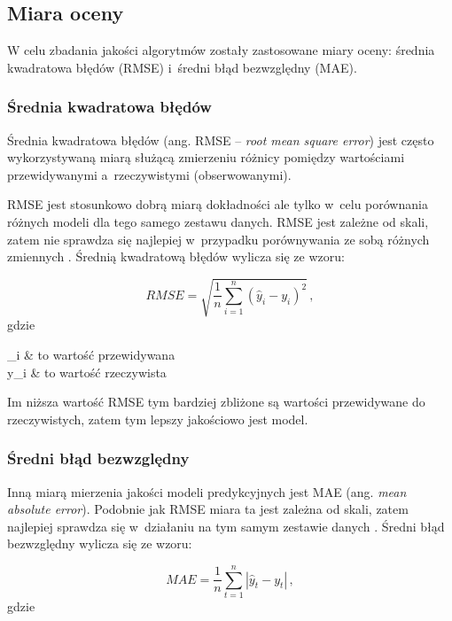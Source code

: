 \documentclass[twoside]{iisthesis}
\begin{document}
		\subsection{Miara oceny}
		
		W celu zbadania jakości algorytmów zostały zastosowane miary oceny: średnia kwadratowa błędów (RMSE) i~średni błąd bezwzględny (MAE).
		
		\subsubsection{Średnia kwadratowa błędów}
	
		Średnia kwadratowa błędów (ang. RMSE -- \textit{root mean square error}) jest często wykorzystywaną miarą służącą zmierzeniu różnicy pomiędzy wartościami przewidywanymi a~rzeczywistymi (obserwowanymi). 
		
		RMSE jest stosunkowo dobrą miarą dokładności ale tylko w~celu porównania  różnych modeli dla tego samego zestawu danych. RMSE jest zależne od skali, zatem nie sprawdza się najlepiej w~przypadku porównywania ze sobą różnych zmiennych \cite{hyndman2006another}. Średnią kwadratową błędów wylicza się ze wzoru:
		
		\begin{equation}
			\label{eq:rmse}
			RMSE = \sqrt{ \frac{1}{n} \sum_{i=1}^{n} (\hat{y}_i - y_i)^2 }
			\,,
		\end{equation}	
		gdzie
		
		\begin{conditions*}
			_i & to wartość przewidywana \\
			y_i  &  to wartość rzeczywista
		\end{conditions*} 
		
		Im niższa wartość RMSE tym bardziej zbliżone są wartości przewidywane do rzeczywistych, zatem tym lepszy jakościowo jest model. 
		
		\subsubsection{Średni błąd bezwzględny}
		
		Inną miarą mierzenia jakości modeli predykcyjnych jest MAE (ang. \textit{mean absolute error}). Podobnie jak RMSE miara ta jest zależna od skali, zatem najlepiej sprawdza się w~działaniu na tym samym zestawie danych \cite{hyndman2006another}. Średni błąd bezwzględny wylicza się ze wzoru:
		
		\begin{equation}
		\label{eq:mae}
		MAE = \frac{1}{n} \sum_{t=1}^{n} |\hat{y}_t - y_t|
		\,,
		\end{equation}		
		gdzie
		
\end{document}

